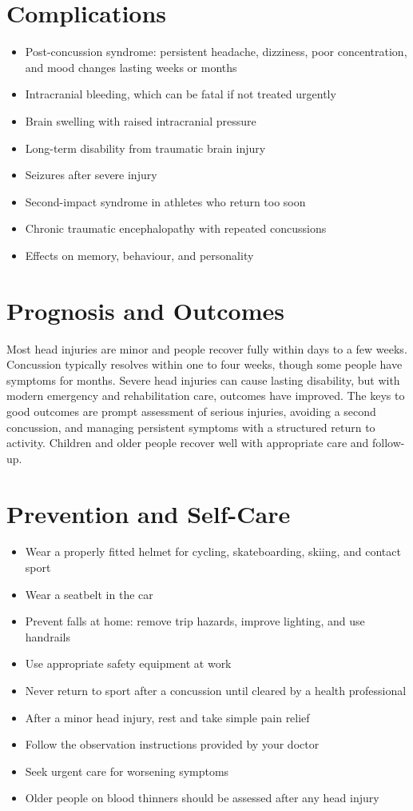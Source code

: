 \section*{Complications}
\begin{itemize}
    \item Post-concussion syndrome: persistent headache, dizziness, poor concentration, and mood changes lasting weeks or months
    \item Intracranial bleeding, which can be fatal if not treated urgently
    \item Brain swelling with raised intracranial pressure
    \item Long-term disability from traumatic brain injury
    \item Seizures after severe injury
    \item Second-impact syndrome in athletes who return too soon
    \item Chronic traumatic encephalopathy with repeated concussions
    \item Effects on memory, behaviour, and personality
\end{itemize}

\section*{Prognosis and Outcomes}
Most head injuries are minor and people recover fully within days to a few weeks. Concussion typically resolves within one to four weeks, though some people have symptoms for months. Severe head injuries can cause lasting disability, but with modern emergency and rehabilitation care, outcomes have improved. The keys to good outcomes are prompt assessment of serious injuries, avoiding a second concussion, and managing persistent symptoms with a structured return to activity. Children and older people recover well with appropriate care and follow-up.

\section*{Prevention and Self-Care}
\begin{itemize}
    \item Wear a properly fitted helmet for cycling, skateboarding, skiing, and contact sport
    \item Wear a seatbelt in the car
    \item Prevent falls at home: remove trip hazards, improve lighting, and use handrails
    \item Use appropriate safety equipment at work
    \item Never return to sport after a concussion until cleared by a health professional
    \item After a minor head injury, rest and take simple pain relief
    \item Follow the observation instructions provided by your doctor
    \item Seek urgent care for worsening symptoms
    \item Older people on blood thinners should be assessed after any head injury
\end{itemize}

